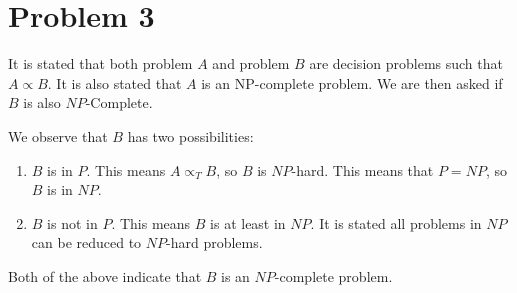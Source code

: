 \section*{Problem 3}

It is stated that both problem $A$ and problem $B$ are decision problems such that $A \propto B$. It is also stated that $A$ is an NP-complete problem. We are then asked if $B$ is also $NP$-Complete.

We observe that $B$ has two possibilities:
\begin{enumerate}
    \item $B$ is in $P$. This means $A \propto_T B$, so $B$ is $NP$-hard. This means that $P = NP$, so $B$ is in $NP$.
    \item $B$ is not in $P$. This means $B$ is at least in $NP$. It is stated all problems in $NP$ can be reduced to $NP$-hard problems.
\end{enumerate}

Both of the above indicate that $B$ is an $NP$-complete problem.